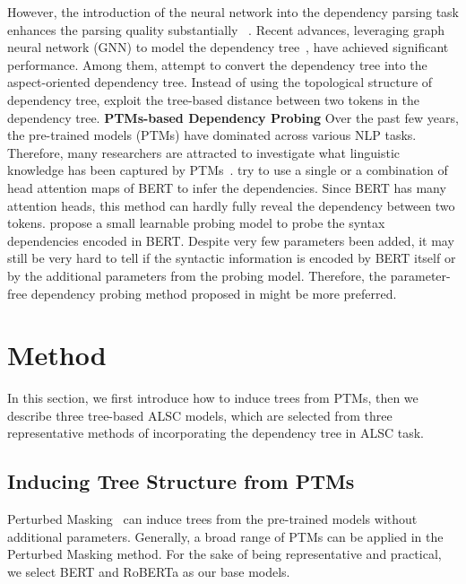 \documentclass[11pt]{article}
\begin{document}
However, the introduction of the neural network into the dependency parsing task enhances the parsing quality substantially ~\citep{chen2014fast,DBLP:conf/iclr/DozatM17}. Recent advances,  leveraging graph neural network (GNN) to model the dependency tree~\citep{DBLP:conf/emnlp/ZhangLS19,DBLP:conf/emnlp/HuangC19a,DBLP:conf/emnlp/SunZMML19,DBLP:conf/acl/TangJLZ20,DBLP:conf/acl/WangSYQW20}, have achieved significant performance.  Among them, \citet{DBLP:conf/aaai/ZhengZMM20,DBLP:conf/acl/WangSYQW20} attempt to convert the dependency tree into the aspect-oriented dependency tree. Instead of using the topological structure of dependency tree, \citet{DBLP:conf/coling/HeLND18,DBLP:conf/sigir/ZhangL019,DBLP:conf/acl/PhanO20} exploit the tree-based distance between two tokens in the dependency tree. \newline
\textbf{PTMs-based Dependency Probing}
Over the past few years, the pre-trained  models (PTMs) have dominated across various NLP tasks. Therefore, many researchers are attracted to investigate what linguistic knowledge has been captured by PTMs~\citep{DBLP:journals/corr/abs-1906-04341,DBLP:conf/emnlp/HewittL19,DBLP:conf/naacl/HewittM19,DBLP:conf/acl/WuCKL20}. \citet{DBLP:journals/corr/abs-1906-04341} try to use a single or a combination of head attention maps of BERT to infer the dependencies. Since BERT has many attention heads, this method can hardly fully reveal the dependency between two tokens. \citet{DBLP:conf/naacl/HewittM19} propose a small learnable probing model to probe the syntax dependencies encoded in BERT. Despite very few parameters been added, it may still be very hard to tell if the syntactic information is encoded by BERT itself or by the additional parameters from the probing model. Therefore, the parameter-free dependency probing method proposed in \citet{DBLP:conf/acl/WuCKL20} might be more preferred.


\section{Method}
In this section, we first introduce how to induce trees from PTMs, then we describe three tree-based ALSC models, which are selected from three representative methods of incorporating the dependency tree in ALSC task.
\subsection{Inducing Tree Structure from PTMs}
Perturbed Masking~\citep{DBLP:conf/acl/WuCKL20} can induce  trees from the pre-trained  models without additional parameters. Generally, a broad range of PTMs can be applied  in the Perturbed Masking method. For the sake of being representative and practical, we select BERT and RoBERTa as our base models.
\end{document}

